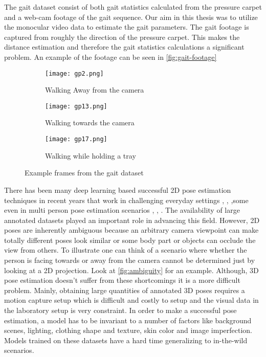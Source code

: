 The gait dataset consist of both gait statistics calculated from the pressure carpet and a web-cam footage of the gait sequence. Our aim in this thesis was to utilize the monocular video data to estimate the gait parameters. The gait footage is captured from roughly the direction of the pressure carpet. This makes the distance estimation and therefore the gait statistics calculations a significant problem. An example of the footage can be seen in \autoref{fig:gait-footage}

\begin{figure}[htpb]
	\centering
	\begin{subfigure}[b]{0.3\linewidth}
   		\texttt{[image: gp2.png]}
    	\caption{Walking Away from the camera}
    \end{subfigure}
    \begin{subfigure}[b]{0.3\linewidth}
   		\texttt{[image: gp13.png]}
    	\caption{Walking towards the camera}
    \end{subfigure}
    \begin{subfigure}[b]{0.3\linewidth}
   		\texttt{[image: gp17.png]}
    	\caption{Walking while holding a tray}
    \end{subfigure}
    \caption{Example frames from the gait dataset}
    \label{fig:gait-footage}
\end{figure}

There has been many deep learning based successful 2D pose estimation techniques in recent years that work in challenging everyday settings \parencite{newell2016stacked}, \parencite{chu2017multi}, \parencite{chou2017self} ,some even in multi person pose estimation scenarios \parencite{cao2016realtime}, \parencite{iqbal2017posetrack}, \parencite{insafutdinov2017arttrack}. The availability of large annotated datasets played an important role in advancing this field. However, 2D poses are inherently ambiguous because an arbitrary camera viewpoint can make totally different poses look similar or some body part or objects can occlude the view from others. To illustrate one can think of a scenario where whether the person is facing towards or away from the camera cannot be determined just by looking at a 2D projection. Look at \autoref{fig:ambiguity} for an example. Although, 3D pose estimation doesn't suffer from these shortcomings it is a more difficult problem. Mainly, obtaining large quantities of annotated 3D poses requires a motion capture setup which is difficult and costly to setup and the visual data in the laboratory setup is very constraint. In order to make a successful pose estimation, a model has to be invariant to a number of factors like background scenes, lighting, clothing shape and texture, skin color and image imperfection. Models trained on these datasets have a hard time generalizing to in-the-wild scenarios.


